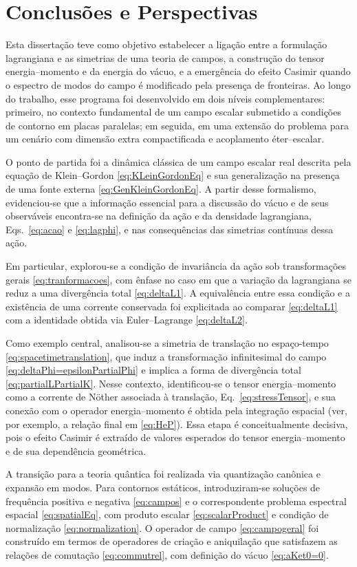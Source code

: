 \chapter{Conclusões e Perspectivas}

Esta dissertação teve como objetivo estabelecer a ligação entre a formulação lagrangiana e as simetrias de uma teoria de campos, a construção do tensor energia--momento e da energia do vácuo, e a emergência do efeito Casimir quando o espectro de modos do campo é modificado pela presença de fronteiras. Ao longo do trabalho, esse programa foi desenvolvido em dois níveis complementares: primeiro, no contexto fundamental de um campo escalar submetido a condições de contorno em placas paralelas; em seguida, em uma extensão do problema para um cenário com dimensão extra compactificada e acoplamento éter--escalar.

O ponto de partida foi a dinâmica clássica de um campo escalar real descrita pela equação de Klein--Gordon \eqref{eq:KLeinGordonEq} e sua generalização na presença de uma fonte externa \eqref{eq:GenKleinGordonEq}. A partir desse formalismo, evidenciou-se que a informação essencial para a discussão do vácuo e de seus observáveis encontra-se na definição da ação e da densidade lagrangiana, Eqs.~\eqref{eq:acao} e \eqref{eq:lagphi}, e nas consequências das simetrias contínuas dessa ação.

Em particular, explorou-se a condição de invariância da ação sob transformações gerais \eqref{eq:tranformacoes}, com ênfase no caso em que a variação da lagrangiana se reduz a uma divergência total \eqref{eq:deltaL1}. A equivalência entre essa condição e a existência de uma corrente conservada foi explicitada ao comparar \eqref{eq:deltaL1} com a identidade obtida via Euler--Lagrange \eqref{eq:deltaL2}.

Como exemplo central, analisou-se a simetria de translação no espaço-tempo \eqref{eq:spacetimetranslation}, que induz a transformação infinitesimal do campo \eqref{eq:deltaPhi=epsilonPartialPhi} e implica a forma de divergência total \eqref{eq:partialLPartialK}. Nesse contexto, identificou-se o tensor energia--momento como a corrente de Nöther associada à translação, Eq.~\eqref{eq:stressTensor}, e sua conexão com o operador energia--momento é obtida pela integração espacial (ver, por exemplo, a relação final em \eqref{eq:HeP}). Essa etapa é conceitualmente decisiva, pois o efeito Casimir é extraído de valores esperados do tensor energia--momento e de sua dependência geométrica.

A transição para a teoria quântica foi realizada via quantização canônica e expansão em modos. Para contornos estáticos, introduziram-se soluções de frequência positiva e negativa \eqref{eq:campos} e o correspondente problema espectral espacial \eqref{eq:spatialEq}, com produto escalar \eqref{eq:scalarProduct} e condição de normalização \eqref{eq:normalization}. O operador de campo \eqref{eq:campogeral} foi construído em termos de operadores de criação e aniquilação que satisfazem as relações de comutação \eqref{eq:commutrel}, com definição do vácuo \eqref{eq:aKet0=0}.

